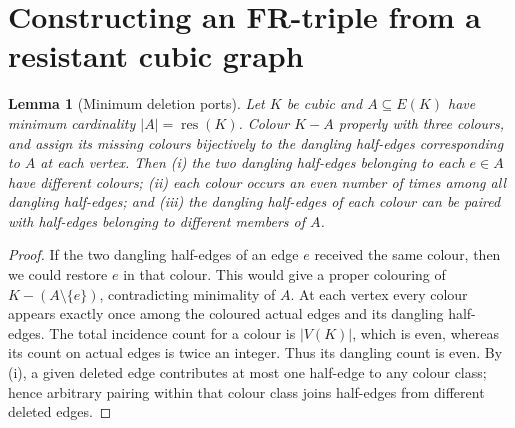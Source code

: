 \documentclass[11pt]{article}
\newtheorem{lemma}{Lemma}
\newcommand{\rc}{\operatorname{res}}
\begin{document}
\section{Constructing an FR-triple from a resistant cubic graph}
\begin{lemma}[Minimum deletion ports]\label{lem:ports}
Let $K$ be cubic and $A\subseteq E(K)$ have minimum cardinality $|A|=\rc(K)$. Colour $K-A$ properly with three colours, and assign its missing colours bijectively to the dangling half-edges corresponding to $A$ at each vertex. Then (i) the two dangling half-edges belonging to each $e\in A$ have \emph{different} colours; (ii) each colour occurs an even number of times among all dangling half-edges; and (iii) the dangling half-edges of each colour can be paired with half-edges belonging to \emph{different} members of $A$.
\end{lemma}
\begin{proof}
If the two dangling half-edges of an edge $e$ received the same colour, then we could restore $e$ in that colour. This would give a proper colouring of $K-(A\setminus\{e\})$, contradicting minimality of $A$. At each vertex every colour appears exactly once among the coloured actual edges and its dangling half-edges. The total incidence count for a colour is $|V(K)|$, which is even, whereas its count on actual edges is twice an integer. Thus its dangling count is even. By (i), a given deleted edge contributes at most one half-edge to any colour class; hence arbitrary pairing within that colour class joins half-edges from different deleted edges.
\end{proof}
\end{document}
